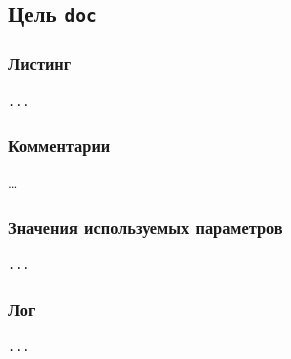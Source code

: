\subsection{Цель \texttt{doc}}

\subsubsection{Листинг}

\begin{lstlisting}[caption={Часть содержимого файла \texttt{build.xml}},captionpos=b]
...
\end{lstlisting}

\subsubsection{Комментарии}

\dots

\subsubsection{Значения используемых параметров}

\begin{lstlisting}[language=Properties,caption={Часть содержимого файла \texttt{build.properties}},captionpos=b]
...
\end{lstlisting}

\subsubsection{Лог}

\begin{lstlisting}[caption={Лог цели \texttt{doc}},language={},captionpos=b]
...
\end{lstlisting}
